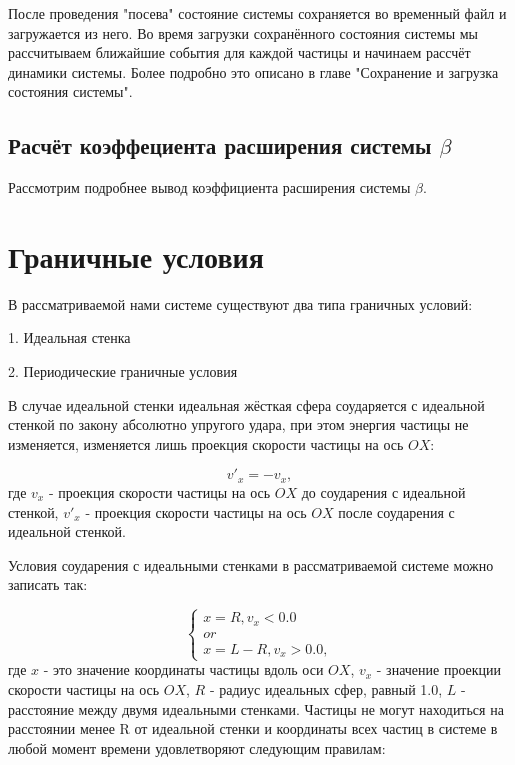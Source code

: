 \documentclass{article}
\begin{document}
После проведения "посева" состояние системы сохраняется во временный файл и загружается из него. Во время загрузки сохранённого состояния системы мы рассчитываем ближайшие события для каждой частицы и начинаем рассчёт динамики системы. Более подробно это описано в главе "Сохранение и загрузка состояния системы".

\subsection{Расчёт коэффециента расширения системы $ \beta $ }
Рассмотрим подробнее вывод коэффициента расширения системы $ \beta $.


\newpage
\section{Граничные условия}

В рассматриваемой нами системе существуют два типа граничных условий:

1. Идеальная стенка

2. Периодические граничные условия

В случае идеальной стенки идеальная жёсткая сфера соударяется с идеальной стенкой по закону абсолютно упругого удара, при этом энергия частицы не изменяется, изменяется лишь проекция скорости частицы на ось $ OX $:

\begin{equation}
v'_x = -v_x,
\end{equation}
где $ v_x $ - проекция скорости частицы на ось $ OX $ до соударения с идеальной стенкой, $ v'_x $ - проекция скорости частицы на ось $ OX $ после соударения с идеальной стенкой.

Условия соударения с идеальными стенками в рассматриваемой системе можно записать так:

\begin{equation}\label{eq:condition_of_collision_with_ideal_wall}
    \begin{cases}
        x = R, v_x < 0.0
        \\
        or
        \\
        x = L - R, v_x > 0.0,
    \end{cases}
\end{equation}
где $ x $ - это значение координаты частицы вдоль оси $ OX $, $ v_x $ - значение проекции скорости частицы на ось $ OX $, $ R $ - радиус идеальных сфер, равный 1.0, $ L $ - расстояние между двумя идеальными стенками. Частицы не могут находиться на расстоянии менее R от идеальной стенки и координаты всех частиц в системе в любой момент времени удовлетворяют следующим правилам:
\end{document}
